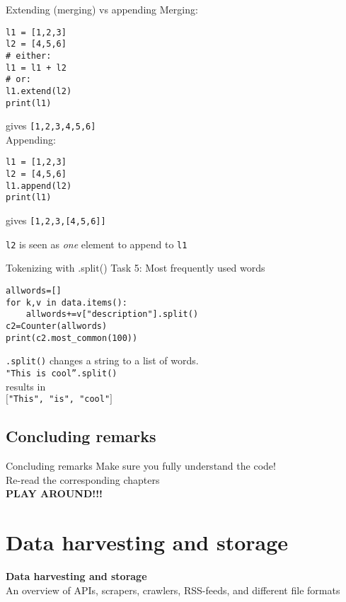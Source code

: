 \documentclass{beamer}
\begin{document}
\begin{frame}[fragile]{Extending (merging) vs appending}
Merging:
\begin{lstlisting}
l1 = [1,2,3]
l2 = [4,5,6]
# either:
l1 = l1 + l2
# or:
l1.extend(l2)
print(l1)
\end{lstlisting}
gives \texttt{[1,2,3,4,5,6]}
~\\

Appending:
\begin{lstlisting}
l1 = [1,2,3]
l2 = [4,5,6]
l1.append(l2)
print(l1)
\end{lstlisting}
gives \texttt{[1,2,3,[4,5,6]]}

\texttt{l2} is seen as \emph{one} element to append to \texttt{l1}
\end{frame}


\begin{frame}[fragile]{Tokenizing with .split()}
Task 5: Most frequently used words
\begin{lstlisting}
allwords=[]
for k,v in data.items():
    allwords+=v["description"].split()
c2=Counter(allwords)
print(c2.most_common(100))
\end{lstlisting}
\scriptsize{
\texttt{.split()} changes a string to a list of words.\\ \texttt{"This is cool''.split()} \\results in\\ \texttt{$[$"This", "is", "cool"$]$}\\
}
\end{frame}


\subsection{Concluding remarks}
\begin{frame}{Concluding remarks}
Make sure you fully understand the code!\\
\vspace{1cm}
Re-read the corresponding chapters\\
\vspace{1cm}
\textbf{PLAY AROUND!!!}\\
\end{frame}



\section{Data harvesting and storage}
\begin{frame}[plain]
\textbf{Data harvesting and storage}\\
\vspace{1cm}
An overview of APIs, scrapers, crawlers, RSS-feeds, and different file formats
\end{frame}
\end{document}
